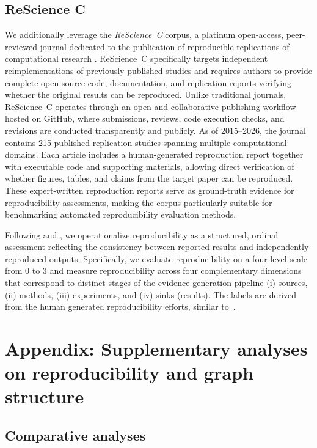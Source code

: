 \documentclass{article}
\begin{document}
\subsection{ReScience C}

We additionally leverage the \textit{ReScience~C} corpus, a platinum open-access, peer-reviewed journal dedicated to the publication of reproducible replications of computational research \citep{rougier2018rescience}. 
ReScience~C specifically targets independent reimplementations of previously published studies and requires authors to provide complete open-source code, documentation, and replication reports verifying whether the original results can be reproduced. 
Unlike traditional journals, ReScience~C operates through an open and collaborative publishing workflow hosted on GitHub, where submissions, reviews, code execution checks, and revisions are conducted transparently and publicly. 
As of 2015–2026, the journal contains 215 published replication studies spanning multiple computational domains. 
Each article includes a human-generated reproduction report together with executable code and supporting materials, allowing direct verification of whether figures, tables, and claims from the target paper can be reproduced. 
These expert-written reproduction reports serve as ground-truth evidence for reproducibility assessments, making the corpus particularly suitable for benchmarking automated reproducibility evaluation methods.

Following \citep{hu2025repro} and \citep{brodeur2024mass}, we operationalize reproducibility as a structured, ordinal assessment reflecting the consistency between reported results and independently reproduced outputs. Specifically, we evaluate reproducibility on a four-level scale from 0 to 3 and measure reproducibility across four complementary dimensions that correspond to distinct stages of the evidence-generation pipeline (i) sources, (ii) methods, (iii) experiments, and (iv) sinks (results).
The labels are derived from the human generated reproducibility efforts, similar to~\citep{hu2025repro}.

\section{Appendix: Supplementary analyses on reproducibility and graph structure}
\label{app:repro_graph}

\subsection{Comparative analyses}
\label{app:comparative-analyses}
\end{document}
